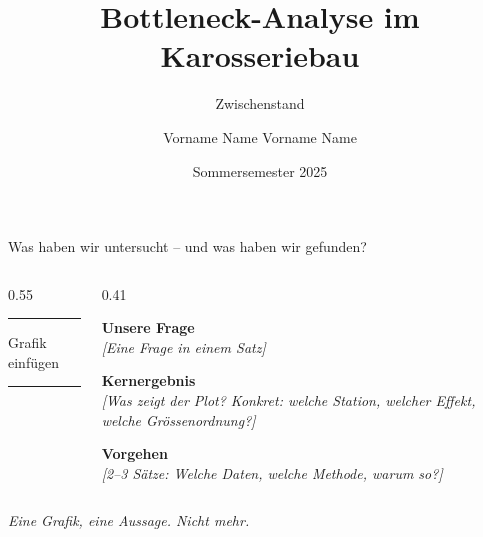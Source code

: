 \documentclass[aspectratio=169, 11pt]{beamer}
\title{Bottleneck-Analyse im Karosseriebau}
\subtitle{Zwischenstand}
\author{Vorname Name \quad Vorname Name}
\institute{Datenanalyse im Produktionsumfeld}
\date{Sommersemester 2025}
\newcommand{\hinweis}[1]{{\scriptsize\color{mutedtext}\textit{#1}}}
\begin{document}
\maketitle

\begin{frame}{Was haben wir untersucht -- und was haben wir gefunden?}

  \begin{columns}[T, onlytextwidth]
    \begin{column}{0.55\textwidth}

      \begin{center}
        \textcolor{rulecolor}{\rule{\linewidth}{0.4pt}}
        \vspace{1.5cm}
        {\small\textcolor{mutedtext}{Grafik einfügen}}
        \vspace{1.5cm}
        \textcolor{rulecolor}{\rule{\linewidth}{0.4pt}}
      \end{center}

    \end{column}

    \begin{column}{0.41\textwidth}

      \textbf{Unsere Frage}\\[4pt]
      {\small\textit{[Eine Frage in einem Satz]}}

      \vspace{10pt}
      \textbf{Kernergebnis}\\[4pt]
      {\small\textit{[Was zeigt der Plot? Konkret:
      welche Station, welcher Effekt, welche Grössenordnung?]}}

      \vspace{10pt}
      \textbf{Vorgehen}\\[4pt]
      {\small\textit{[2--3 Sätze: Welche Daten,
      welche Methode, warum so?]}}

    \end{column}
  \end{columns}

  \hinweis{Eine Grafik, eine Aussage. Nicht mehr.}

\end{frame}
\end{document}
